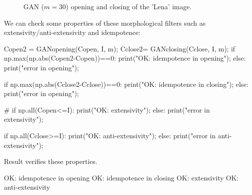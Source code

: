 \begin{figure}[htbp]
\centering\caption{GAN ($m=30$) opening and closing of the 'Lena' image.}%
 \hfill
  \hfill
 \label{fig:ganip:python:openingclosing}
\end{figure}

We can check some properties of these morphological filters such as extensivity/anti-extensivity and idempotence:

\begin{python}
Copen2 = GANopening(Copen, I, m);
Cclose2= GANclosing(Cclose, I, m);
if np.max(np.abs(Copen2-Copen))==0:
    print("OK: idempotence in opening");
else:
    print("error in opening");
    
if np.max(np.abs(Cclose2-Cclose))==0:
    print("OK: idempotence in closing");
else:
    print("error in opening");
\end{python}

\begin{python}
#%
if np.all(Copen<=I):
    print("OK: extensivity");
else:
    print("error in extensivity");

if np.all(Cclose>=I):
    print("OK: anti-extensivity");
else:
    print("error in anti-extensivity");
\end{python}

Result verifies these properties.
\begin{sh}
OK: idempotence in opening
OK: idempotence in closing
OK: extensivity
OK: anti-extensivity
\end{sh}
